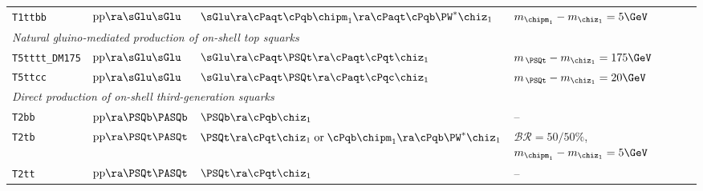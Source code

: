 \begin{table}[!t]
\begin{tabular}{ llll }
\texttt{T1ttbb}        %
                       & $\text{pp}\ra\sGlu\sGlu$      
                       & $\sGlu\ra\cPaqt\cPqb\chipm_1\ra\cPaqt\cPqb\PW^*\chiz_1$
                       & $m_{\chipm_1} - m_{\chiz_1} = 5\GeV$                                           \\ [0.5ex]
\multicolumn{4}{l}{\it Natural gluino-mediated production of on-shell top squarks}                     \\ [0.5ex]
\texttt{T5tttt\_DM175}        %
                       & $\text{pp}\ra\sGlu\sGlu$      
                       & $\sGlu\ra\cPaqt\PSQt\ra\cPaqt\cPqt\chiz_1$ 
                       & $m_{\,\PSQt} - m_{\chiz_1} = 175\GeV$                                          \\ [0.5ex]
\texttt{T5ttcc}        %
                       & $\text{pp}\ra\sGlu\sGlu$       
                       & $\sGlu\ra\cPaqt\PSQt\ra\cPaqt\cPqc\chiz_1$ 
                       & $m_{\,\PSQt} - m_{\chiz_1} = 20\GeV$                                           \\ [0.5ex]
\multicolumn{4}{l}{\it Direct production of on-shell third-generation squarks}                         \\ [0.5ex]
\texttt{T2bb}          %
                       & $\text{pp}\ra\PSQb\PASQb$     
                       & $\PSQb\ra\cPqb\chiz_1$
                       & --                                                                             \\ [0.5ex]
\texttt{T2tb}          %
                       & $\text{pp}\ra\PSQt\PASQt$     
                       & $\PSQt\ra\cPqt\chiz_1 \;\text{or}\; \cPqb\chipm_1\ra\cPqb\PW^*\chiz_1$
                       & $\mathcal{BR} = 50/50\%$, $m_{\chipm_1} - m_{\chiz_1} = 5\GeV$                 \\ [0.5ex]
\texttt{T2tt}          %
                       & $\text{pp}\ra\PSQt\PASQt$
                       & $\PSQt\ra\cPqt\chiz_1$
                       & --                                                                             \\ [0.5ex]

\end{tabular}
\end{table}
